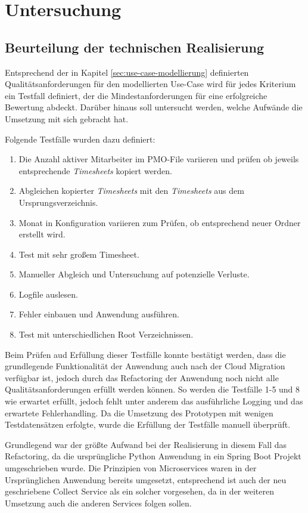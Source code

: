 \chapter{Untersuchung}
\section{Beurteilung der technischen Realisierung}
Entsprechend der in Kapitel \ref{sec:use-case-modellierung} definierten Qualitätsanforderungen für den modellierten Use-Case wird für jedes Kriterium ein Testfall definiert, der die Mindestanforderungen für eine erfolgreiche Bewertung abdeckt. Darüber hinaus soll untersucht werden, welche Aufwände die Umsetzung mit sich gebracht hat.

Folgende Testfälle wurden dazu definiert:
\begin{enumerate}
    \item Die Anzahl aktiver Mitarbeiter im PMO-File variieren und prüfen ob jeweils entsprechende \textit{\glspl{Timesheet}} kopiert werden.
    \item Abgleichen kopierter \textit{\glspl{Timesheet}} mit den \textit{\glspl{Timesheet}} aus dem Ursprungsverzeichnis.
    \item Monat in Konfiguration variieren zum Prüfen, ob entsprechend neuer Ordner erstellt wird.
    \item Test mit sehr großem Timesheet.
    \item Manueller Abgleich und Untersuchung auf potenzielle Verluste.
    \item Logfile auslesen.
    \item Fehler einbauen und Anwendung ausführen.
    \item Test mit unterschiedlichen Root Verzeichnissen.
\end{enumerate}

Beim Prüfen aud Erfüllung dieser Testfälle konnte bestätigt werden, dass die grundlegende Funktionalität der Anwendung auch nach der Cloud Migration verfügbar ist, jedoch durch das Refactoring der Anwendung noch nicht alle Qualitätsanforderungen erfüllt werden können. So werden die Testfälle 1-5 und 8 wie erwartet erfüllt, jedoch fehlt unter anderem das ausführliche Logging und das erwartete Fehlerhandling. Da  die Umsetzung des Prototypen mit wenigen Testdatensätzen erfolgte, wurde die Erfüllung der Testfälle manuell überprüft.

Grundlegend war der größte Aufwand bei der Realisierung in diesem Fall das Refactoring, da die ursprüngliche Python Anwendung in ein Spring Boot Projekt umgeschrieben wurde. Die Prinzipien von Microservices waren in der Ursprünglichen Anwendung bereits umgesetzt, entsprechend ist auch der neu geschriebene Collect Service als ein solcher vorgesehen, da in der weiteren Umsetzung auch die anderen Services folgen sollen.

